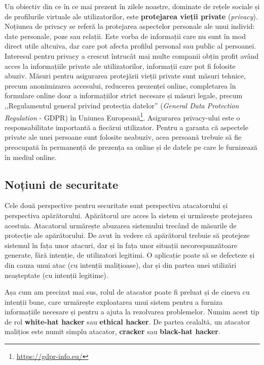 Un obiectiv din ce în ce mai prezent în zilele noastre, dominate de rețele sociale și de profilurile virtuale ale utilizatorilor, este \textbf{protejarea vieții private} (\textit{privacy}). Noțiunea de privacy se referă la protejarea aspectelor personale ale unui individ: date personale, poze sau relații. Este vorba de informații care nu sunt în mod direct utile altcuiva, dar care pot afecta profilul personal sau public al persoanei. Interesul pentru privacy a crescut întrucât mai multe companii obțin profit având acces la informațiile private ale utilizatorilor, informații care pot fi folosite abuziv. Măsuri pentru asigurarea protejării vieții private sunt măsuri tehnice, precum anonimizarea accesului, reducerea prezenței online, completarea în formulare online doar a informațiilor strict necesare și măsuri legale, precum ,,Regulamentul general privind protecția datelor'' (\textit{General Data Protection Regulation} - GDPR) în Uniunea Europeană\footnote{\url{https://gdpr-info.eu/}}. Asigurarea privacy-ului este o responsabilitate importantă a fiecărui utilizator. Pentru a garanta că aspectele private ale unei persoane sunt folosite neabuziv, acea persoană trebuie să fie preocupată în permanență de prezența sa online și de datele pe care le furnizează în mediul online.

\subsection{Noțiuni de securitate}
\label{sec:sec:fundamentals:notions}

Cele două perspective pentru securitate sunt perspectiva atacatorului și perspectiva apărătorului. Apărătorul are acces la sistem și urmărește protejarea acestuia. Atacatorul urmărește abuzarea sistemului trecând de măsurile de protecție ale apărătorului. De avut în vedere că apărătorul trebuie să protejeze sistemul în fața unor atacuri, dar și în fața unor situații necorespunzătoare generate, fără intenție, de utilizatori legitimi. O aplicație poate să se defecteze și din cauza unui atac (cu intenții malițioase), dar și din partea unei utilizări neașteptate (cu intenții legitime).

Așa cum am precizat mai sus, rolul de atacator poate fi preluat și de cineva cu intenții bune, care urmărește exploatarea unui sistem pentru a furniza informațiile necesare și pentru a ajuta la rezolvarea problemelor. Numim acest tip de rol \textbf{white-hat hacker} sau \textbf{ethical hacker}. De partea cealaltă, un atacator malițios este numit simplu atacator, \textbf{cracker} sau \textbf{black-hat hacker}.

